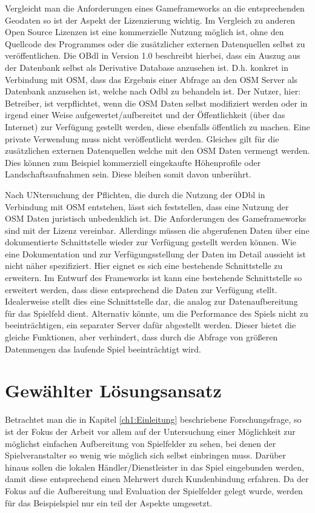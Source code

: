 Vergleicht man die Anforderungen eines Gameframeworks an die entsprechenden Geodaten so ist der Aspekt der Lizenzierung wichtig. Im Vergleich zu anderen Open Source Lizenzen ist eine kommerzielle Nutzung möglich ist, ohne den Quellcode des Programmes oder die zusätzlicher externen Datenquellen selbst zu veröffentlichen.
Die OBdl in Version 1.0 \cite{Odbl.2014} beschreibt hierbei, dass ein Auszug aus der Datenbank selbst als Derivative Database anzusehen ist. D.h. konkret in Verbindung mit OSM, dass das Ergebnis einer Abfrage an den OSM Server als Datenbank anzusehen ist, welche nach Odbl zu behandeln ist. Der Nutzer, hier: Betreiber, ist verpflichtet, wenn die OSM Daten selbst modifiziert werden oder in irgend einer Weise aufgewertet/aufbereitet und der Öffentlichkeit (über das Internet) zur Verfügung gestellt werden, diese ebenfalls öffentlich zu machen. Eine private Verwendung muss nicht veröffentlicht werden. Gleiches gilt für die zusätzlichen externen Datenquellen welche mit den OSM Daten vermengt werden. Dies können zum Beispiel kommerziell eingekaufte Höhenprofile oder Landschaftsaufnahmen sein. Diese bleiben somit davon unberührt.

Nach UNtersuchung  der Pflichten, die durch die Nutzung der ODbl in Verbindung mit OSM entstehen, lässt sich feststellen, dass eine Nutzung der OSM Daten juristisch unbedenklich ist. 
Die Anforderungen des Gameframeworks sind mit der Lizenz vereinbar.
Allerdings müssen die abgerufenen Daten über eine dokumentierte Schnittstelle wieder zur Verfügung gestellt werden können.
Wie eine Dokumentation und zur Verfügungsstellung der Daten im Detail aussieht ist nicht näher spezifiziert. Hier eignet es sich eine bestehende Schnittstelle zu erweitern. Im Entwurf des Frameworks ist kann eine bestehende Schnittstelle so erweitert werden, dass diese entsprechend die Daten zur Verfügung stellt. Idealerweise stellt dies eine Schnittstelle dar, die analog zur Datenaufbereitung für das Spielfeld dient. Alternativ könnte, um die Performance des Spiels nicht zu beeinträchtigen, ein separater Server dafür abgestellt werden. Dieser bietet die gleiche Funktionen, aber verhindert, dass durch die Abfrage von größeren Datenmengen das laufende Spiel beeinträchtigt wird.

\section{Gewählter Lösungsansatz}
\label{ch4:s:choosen_solution}

Betrachtet man die in Kapitel \ref{ch1:Einleitung} beschriebene Forschungsfrage, so ist der Fokus der Arbeit vor allem auf der Untersuchung einer Möglichkeit zur möglichst einfachen Aufbereitung von Spielfelder zu sehen, bei denen der Spielveranstalter so wenig wie möglich sich selbst einbringen muss. Darüber hinaus sollen die lokalen Händler/Dienstleister in das Spiel eingebunden werden, damit diese entsprechend einen Mehrwert durch Kundenbindung erfahren.
Da der Fokus auf die Aufbereitung und Evaluation der Spielfelder gelegt wurde, werden für das Beispielspiel nur ein teil der Aspekte umgesetzt.

